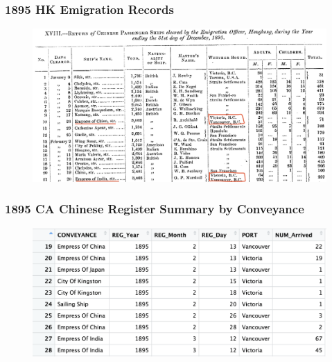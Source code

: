 \documentclass[pdf]{beamer}
\begin{document}
\begin{frame}[label = hk_departure]
	\frametitle{1895 HK Emigration Records}
    \centering
	\begin{figure}[H]
		\begin{center}
			\includegraphics[width=\textwidth]{../../figs/6sep23/hk_departure_1895.jpg}
		\end{center}
	\end{figure}
    \hyperlink{departure}{}
\end{frame}

\begin{frame}[label = reg_summ]
	\frametitle{1895 CA Chinese Register Summary by Conveyance}
    \centering
	\begin{figure}[H]
		\begin{center}
			\includegraphics[width=\textwidth]{../../figs/6sep23/register_summ_1895.png}
		\end{center}
	\end{figure}
    \hyperlink{departure}{}
\end{frame}
\end{document}
